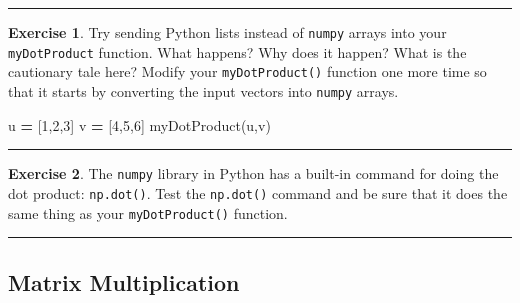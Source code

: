 \documentclass[
]{book}
\newenvironment{Shaded}{\begin{snugshade}}{\end{snugshade}}
\newcommand{\DecValTok}[1]{\textcolor[rgb]{0.00,0.00,0.81}{#1}}
\newcommand{\NormalTok}[1]{#1}
\newcommand{\OperatorTok}[1]{\textcolor[rgb]{0.81,0.36,0.00}{\textbf{#1}}}
\theoremstyle{definition}
\theoremstyle{definition}
\theoremstyle{definition}
\newtheorem{exercise}{Exercise}[chapter]
\theoremstyle{remark}
\begin{document}
\begin{center}\rule{0.5\linewidth}{0.5pt}\end{center}

\begin{exercise}
\protect\hypertarget{exr:unnamed-chunk-296}{}{\label{exr:unnamed-chunk-296} }Try sending Python lists instead of \texttt{numpy} arrays into your \texttt{myDotProduct} function. What happens? Why does it happen? What is the cautionary tale here? Modify your \texttt{myDotProduct()} function one more time so that it starts by converting the input vectors into \texttt{numpy} arrays.
\end{exercise}

\begin{Shaded}
\begin{Highlighting}[]
\NormalTok{u }\OperatorTok{=}\NormalTok{ [}\DecValTok{1}\NormalTok{,}\DecValTok{2}\NormalTok{,}\DecValTok{3}\NormalTok{]}
\NormalTok{v }\OperatorTok{=}\NormalTok{ [}\DecValTok{4}\NormalTok{,}\DecValTok{5}\NormalTok{,}\DecValTok{6}\NormalTok{]}
\NormalTok{myDotProduct(u,v)}
\end{Highlighting}
\end{Shaded}

\begin{center}\rule{0.5\linewidth}{0.5pt}\end{center}

\begin{exercise}
\protect\hypertarget{exr:unnamed-chunk-298}{}{\label{exr:unnamed-chunk-298} }The \texttt{numpy} library in Python has a built-in command for doing the dot product: \texttt{np.dot()}. Test the \texttt{np.dot()} command and be sure that it does the same thing as your \texttt{myDotProduct()} function.
\end{exercise}

\begin{center}\rule{0.5\linewidth}{0.5pt}\end{center}

\hypertarget{matrix-multiplication}{%
\subsection{Matrix Multiplication}\label{matrix-multiplication}}
\end{document}

